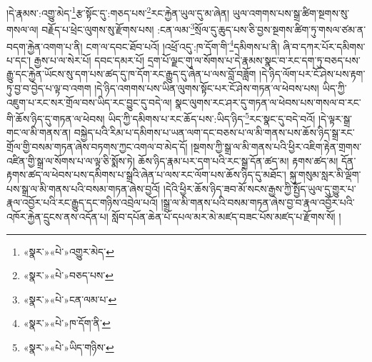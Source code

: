 །དེ་རྣམས་:འགྱུ་མེད་\footnote{«སྣར་»«པེ་»འགྱུར་མེད་}རྩ་སྟོང་དུ་:གཅད་པས་\footnote{«སྣར་»«པེ་»བཅད་པས་}རང་རྐྱེན་ཡུལ་དུ་མ་ཞེན། ཡུལ་འགགས་པས་སྒྲ་ཚིག་སྔགས་སུ་གསལ་ལ། བརྗོད་པ་ཕྲེང་ལུགས་སུ་རྫོགས་པས། :ངན་ལམ་\footnote{«སྣར་»«པེ་»ངན་ལམ་པ་}སྲོལ་དུ་ཆུད་པས་ཅི་བྱས་སྔགས་ཚིག་ཏུ་གསལ་ཙམ་ན་བདག་རྐྱེན་འགག་པ་ནི། ངག་ལ་དབང་ཐོབ་པའོ། །འཕྲོ་འདུ་:ཁ་དོག་གི་\footnote{«སྣར་»«པེ་»ཁ་དོག་ནི་}དམིགས་པ་ནི། ཞི་བ་དཀར་པོར་དམིགས་པ་དང་། རྒྱས་པ་ལ་སེར་པོ། དབང་དམར་པོ། དྲག་པོ་ལྗང་གུ་ལ་སོགས་པ་དེ་རྣམས་སྣང་བ་རང་དག་ཏུ་བཅད་པས་རྒྱུ་དང་རྐྱེན་ཡོངས་སུ་དག་པས་ཚད་དུ་ཁ་དོག་རང་རྒྱུད་དུ་ཞེན་པ་ལས་བློ་བཟློག །དེ་ཉིད་ལོག་པར་ངོ་ཤེས་པས་རྟག་ཏུ་བྱ་བ་བྱེད་པ་ལྟ་བ་འགག །དེ་ཉིད་འགགས་པས་ཡིན་ལུགས་སྟོང་པར་ངོ་ཤེས་གཏན་ལ་ཕེབས་པས། ཡིད་ཀྱི་འཇུག་པ་རང་སར་གྲོལ་བས་ཡིད་རང་བྱུང་དུ་བདེ་ལ། སྣང་ལུགས་རང་ཤར་དུ་གཏན་ལ་ཕེབས་པས་གསལ་བ་རང་གི་ཆོས་ཉིད་དུ་གཏན་ལ་ཕེབས། ཡིད་ཀྱི་དམིགས་པ་རང་ཆོད་པས་:ཡིད་ཉིད་\footnote{«སྣར་»«པེ་»ཡིད་གཉིས་}རང་སྣང་དུ་བདེ་བའོ། །དེ་ལྟར་སྒྲ་གང་ལ་མི་གནས་ན། བསྐྱེད་པའི་རིམ་པ་དམིགས་པ་ཡན་ལག་དང་བཅས་པ་ལ་མི་གནས་པས་ཆོས་ཉིད་སྒྲ་རང་གྲོལ་གྱི་བསམ་གཏན་ཞེས་བཏགས་ཀྱང་འགལ་བ་མེད་དོ། །སྔགས་ཀྱི་སྒྲ་ལ་མི་གནས་པའི་ཕྱིར་འཇིག་རྟེན་གྲགས་འཛིན་གྱི་སྒྲ་ལ་སོགས་པ་ལ་ལྟ་ཅི་སྨོས་ཏེ། ཆོས་ཉིད་རྣམ་པར་དག་པའི་རང་སྒྲ་དོན་ཚད་མ། རྟགས་ཚད་མ། དོན་རྟགས་ཚད་ལ་ཕེབས་པས་དམིགས་པ་སྒྲའི་ཞེན་པ་ལས་རང་ལོག་པས་ཆོས་ཉིད་དུ་མཐོང་། སྐུ་གསུམ་སླར་མི་ལྡོག་པས་སྒྲ་ལ་མི་གནས་པའི་བསམ་གཏན་ཞེས་བྱའོ། །དེའི་ཕྱིར་ཆོས་ཉིད་ཟབ་མོ་སངས་རྒྱས་ཀྱི་སྤྱོད་ཡུལ་དུ་གྱུར་པ་རྣལ་འབྱོར་པའི་རང་རྒྱུད་དང་གཉིས་འབྲེལ་པའོ། །སྒྲ་ལ་མི་གནས་པའི་བསམ་གཏན་ཞེས་བྱ་བ་རྣལ་འབྱོར་པའི་འཁོར་རྐྱེན་དྲུངས་ནས་འདོན་པ། སློབ་དཔོན་ཆེན་པོ་དཔལ་མར་མེ་མཛད་བཟང་པོས་མཛད་པ་རྫོགས་སོ། ། 